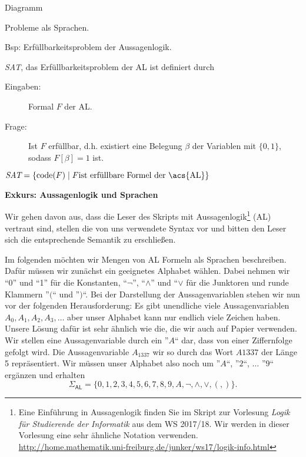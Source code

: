 {Diagramm

\bigskip

Probleme als Sprachen.

Bsp: Erfüllbarkeitsproblem der Aussagenlogik.

\begin{Def}[name={[\textit{SAT}: Erfüllbarkeitsproblem der \acs*{AL}]}]
	\textit{SAT}, das Erfüllbarkeitsproblem der \acf{AL} ist  definiert durch
	\begin{description}
	\item[Eingaben:] Formal $F$ der \acl{AL}.
	\item[Frage:] Ist $F$ erfüllbar, d.h. existiert eine Belegung $\beta$ der Variablen mit $\{0,1\}$, sodass $F[\beta]=1$ ist.
	\end{description}
	$\textit{SAT}=\{\code(F) \mid F\text{ist erfüllbare Formel der \acs{AL}}\}$
\end{Def}

}

\textbf{Exkurs: Aussagenlogik und Sprachen}

Wir gehen davon aus, dass die Leser des Skripts mit Aussagenlogik\footnote{
Eine Einführung in Aussagenlogik finden Sie im Skript zur Vorlesung \emph{Logik für Studierende der Informatik} aus dem WS 2017/18.
Wir werden in dieser Vorlesung eine sehr ähnliche Notation verwenden.
\url{http://home.mathematik.uni-freiburg.de/junker/ws17/logik-info.html}
} (\ac{AL})
vertraut sind, stellen die von uns verwendete Syntax vor und bitten den Leser sich die entsprechende Semantik zu erschließen.

Im folgenden möchten wir Mengen von \ac{AL} Formeln als Sprachen beschreiben.
Dafür müssen wir zunächst ein geeignetes Alphabet wählen.
Dabei nehmen wir ``0'' und ``1'' für die Konstanten,
``$\neg$'', ``$\land$'' und ``$\lor$ für die Junktoren
und runde Klammern ''$($`` und ''$)$``.
Bei der Darstellung der Aussagenvariablen stehen wir nun vor der folgenden Herausforderung:
Es gibt unendliche viele Aussagenvariablen $A_0,A_1,A_2,A_3,\ldots$ aber unser Alphabet kann nur endlich viele Zeichen haben.
Unsere Lösung dafür ist sehr ähnlich wie die, die wir auch auf Papier verwenden.
Wir stellen eine Aussagenvariable durch ein ''$A$`` dar, dass von einer Ziffernfolge gefolgt wird.
Die Aussagenvariable $A_{1337}$ wir so durch das Wort $A1337$ der Länge 5 repräsentiert.
Wir müssen unser Alphabet also noch um ''$A$``, ''$2$``, $\ldots$ ''$9$`` ergänzen und erhalten
$$\Sigma_\mathsf{AL}=\{0,1,2,3,4,5,6,7,8,9,A,\neg,\land,\lor,(,)\}.$$

